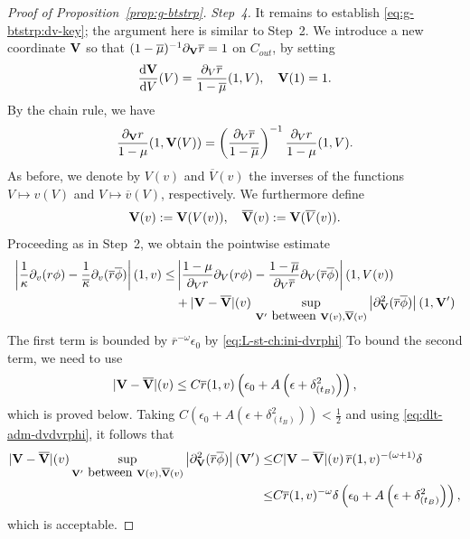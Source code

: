 \documentclass[10pt, reqno]{amsart}
\theoremstyle{definition}
\theoremstyle{remark}
\theoremstyle{conjecture}
\numberwithin{equation}{section}
\newcommand{\abs}[1]{\vert#1\vert}
\newcommand{\ud}{\mathrm{d}}
\newcommand{\rd}{\partial}
\newcommand{\0}{\emptyset}
\newcommand{\dlt}{\delta}
\newcommand{\eps}{\epsilon}
\newcommand{\kpp}{\kappa}
\newcommand{\lmb}{\lambda}
\newcommand{\omg}{\omega}
\newcommand{\bfV}{{\bf V}}
\newcommand{\calH}{\mathcal H}
\newcommand{\calI}{\mathcal I}
\newcommand{\dvr}{\lmb}
\newcommand{\EH}{\calH^{+}}
\newcommand{\pfstep}[1]{\vspace{.5em} {\it \noindent #1.}}
\newcommand{\NI}{\calI^{+}}						%
\newcommand{\ubg}{\overline{u}}					%
\newcommand{\vbg}{\overline{v}}					%
\newcommand{\Vbg}{\overline{V}}					%
\newcommand{\bfVbg}{\overline{\bfV}}				%
\newcommand{\phibg}{\overline{\phi}}				%
\newcommand{\rbg}{\overline{r}}					%
\newcommand{\mubg}{\overline{\mu}}				%
\newcommand{\kppbg}{\overline{\kpp}}					%
\newcommand{\Abs}[1]{\left\vert #1 \right\vert}
\begin{document}
\begin{proof}[Proof of Proposition~\ref{prop:g-btstrp}]
\pfstep{Step~4} 
It remains to establish \eqref{eq:g-btstrp:dv-key}; the argument here is similar to Step~2. We introduce a new coordinate $\bfV$ so that $(1-\mubg)^{-1} \rd_{\bfV} \rbg = 1$ on $C_{out}$, by setting
\begin{equation*}
	\frac{\ud \bfV}{\ud V}(V) = \frac{\rd_{V} \rbg}{1-\mubg} (1, V), \quad \bfV(1) = 1.
\end{equation*}
By the chain rule, we have
\begin{equation*}
	\frac{\rd_{\bfV} r}{1-\mu} (1, \bfV(V)) = \left(\frac{\rd_{V} \rbg}{1-\mubg}\right)^{-1} \frac{\rd_{V} r}{1-\mu} (1, V).
\end{equation*}
As before, we denote by $V(v)$ and $\Vbg(v)$ the inverses of the functions $V \mapsto v(V)$ and $V \mapsto \vbg(V)$, respectively. We furthermore define
\begin{equation*}
	\bfV(v) := \bfV(V(v)), \quad
	\bfVbg(v) := \bfV(\Vbg(v)).
\end{equation*}
Proceeding as in Step~2, we obtain the pointwise estimate
\begin{align*}
	\Abs{ \frac{1}{\kpp} \rd_{v} (r \phi) - \frac{1}{\kppbg} \rd_{v} (\rbg \phibg) }(1, v)
	\leq &\Abs{ \frac{1-\mu}{\rd_{V} r} \rd_{V} (r \phi) - \frac{1-\mubg}{\rd_{V} \rbg} \rd_{V} (\rbg\phibg) } (1, V(v)) \\
		&+ \abs{\bfV - \bfVbg}(v) \, \sup_{\bfV' \hbox{ between } \bfV(v), \bfVbg(v)} \Abs{\rd_{\bfV}^{2} (\rbg \phibg)}(1, \bfV')
\end{align*}
The first term is bounded by $\rbg^{-\omg} \eps_{0}$ by \eqref{eq:L-st-ch:ini-dvrphi}
To bound the second term, we need to use 
\begin{equation} \label{eq:g-btstrp:bfV}
\abs{\bfV - \bfVbg}(v) \leq C \rbg(1, v) \left( \eps_{0} + A \left(\eps + \dlt_{(t_{B})}^{2} \right) \right),
\end{equation}
which is proved below. Taking $C (\eps_{0} + A (\eps + \dlt_{(t_{B})}^{2} ) ) < \frac{1}{2}$ and using \eqref{eq:dlt-adm-dvdvrphi}, it follows that
\begin{align*}
\abs{\bfV - \bfVbg}(v) \sup_{\bfV' \hbox{ between } \bfV(v), \bfVbg(v)} \Abs{\rd_{\bfV}^{2} (\rbg \phibg)}(\bfV')
\leq & C \abs{\bfV - \bfVbg}(v) \, \rbg(1, v)^{-(\omg+1)} \dlt \\
\leq & C \rbg(1, v)^{-\omg} \dlt \left(\eps_{0} + A \left(\eps + \dlt_{(t_{B})}^{2} \right) \right),
\end{align*}
which is acceptable.


\end{proof}
\end{document}
